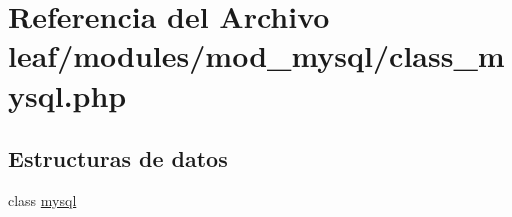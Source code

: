 \hypertarget{mod__mysql_2class__mysql_8php}{\section{Referencia del Archivo leaf/modules/mod\-\_\-mysql/class\-\_\-mysql.php}
\label{mod__mysql_2class__mysql_8php}
}
\subsection*{Estructuras de datos}
\begin{DoxyCompactItemize}
\item 
class \hyperlink{classmysql}{mysql}
\end{DoxyCompactItemize}
